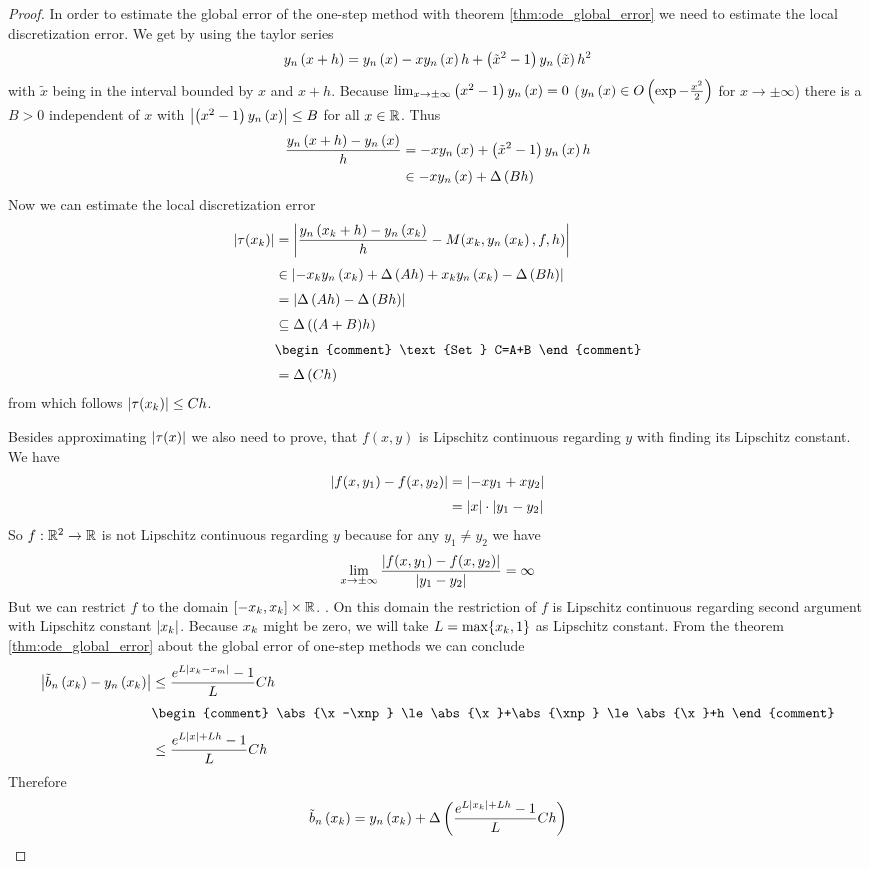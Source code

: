 \begin{proof}
  In order to estimate the global error of the one-step method with theorem \ref{thm:ode_global_error} we need to estimate the local discretization error. We get by using the taylor series
  \begin{align}
    y_{n}\left({x+h}\right) = y_{n}\left({x}\right) -xy_{n}\left({x}\right)h+\left( {\tilde x^2-1} \right)y_{n}\left({\tilde x}\right) h^2
  \end{align}
  with $\tilde x$ being in the interval bounded by $x$ and $x+h$. Because $\lim_{x\to\pm\infty} \left( {x^2-1} \right)y_{n}\left({x}\right)=0$ ($y_{n}\left({x}\right) \in O\left( {\exp{-\frac{x^2}2}} \right)$ for $x\to\pm\infty$) there is a $B > 0$ independent of $x$ with $\left|{\left( {x^2-1} \right)y_{n}\left({x}\right)}\right| \le B$ for all $x\in\mathbb R$. Thus
  \begin{align}
    \frac{y_{n}\left({x+h}\right)-y_{n}\left({x}\right)}h &= -xy_{n}\left({x}\right)+\left( {\tilde x^2-1} \right)y_{n}\left({x}\right) h \\
    &\in -xy_{n}\left({x}\right) + \Delta\left( {Bh} \right)
  \end{align}
  Now we can estimate the local discretization error
  \begin{align}
    \abs{\tau(\x)} &= \abs{\frac{\phin{\x[k]+h}-\phin{\x}}h -  M(\x,\phin{\x},f,h)} \nl
    &\in \abs{-\x\phin{\x} + \bigabs{Ah} +\x\phin{\x} - \bigabs{Bh}} \nl
    &= \abs{\bigabs{Ah}-\bigabs{Bh}} \nl
    &\subseteq \bigabs{(A+B)h} \nl
    &
    \begin{comment}
      \text{Set } C=A+B
    \end{comment} \nl
    &= \bigabs{Ch}
  \end{align}
  from which follows $\left|{\tau(x_{k})}\right| \le Ch$.

  Besides approximating $\left|{\tau(x)}\right|$ we also need to prove, that $f(x,y)$ is Lipschitz continuous regarding $y$ with finding its Lipschitz constant. We have
  \begin{align}
    \abs{f(x,y_1)-f(x,y_2)} &= \abs{-xy_1+xy_2} \nl
    &= \abs{x} \cdot \abs{y_1-y_2}
  \end{align}
  So $f:\mathbb R^2\to\mathbb R$ is not Lipschitz continuous regarding $y$ because for any $y_1\neq y_2$ we have
  \begin{align}
    \lim_{x\to\pm\infty} \frac{\left|{f(x,y_1)-f(x,y_2)}\right|}{\left|{y_1-y_2}\right|} = \infty
  \end{align}
  But we can restrict $f$ to the domain $\left[{-x_{k}},{x_{k}}\right]\times \mathbb R$. . On this domain the restriction of $f$ is Lipschitz continuous regarding second argument with Lipschitz constant $\left|{x_{k}}\right|$. Because $x_{k}$ might be zero, we will take $L=\max\{x_{k},1\}$ as Lipschitz constant. From the theorem \ref{thm:ode_global_error} about the global error of one-step methods we can conclude
  \begin{align}
    \abs{\bb{\x}-\phin{\x}} &\le \frac{\fe{L\abs{\x-\xnp}}-1}L Ch \nl
    &
    \begin{comment}
      \abs{\x-\xnp} \le \abs{\x}+\abs{\xnp} \le \abs{\x}+h
    \end{comment} \nl
    &\le \frac{\fe{L\abs{x}+Lh}-1}L Ch
  \end{align}
  Therefore
  \begin{align}
    \tilde b_{n}\left({x_{k}}\right) = y_{n}\left({x_{k}}\right) + \Delta\left( {\frac{e^{L\left|{x_{k}}\right|+Lh}-1}L Ch} \right)
  \end{align}
\end{proof}

